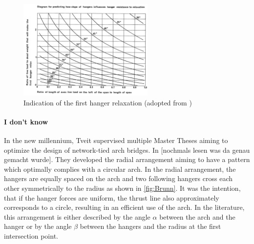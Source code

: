 \begin{figure}[H]
    \centering
    \includegraphics[width=0.6\textwidth]{Pictures/MaximumHangerInclination.png}
    \caption{Indication of the first hanger relaxation (adopted from \citep{Tveit3})}
    \label{fig:Tveit2}
\end{figure}


\paragraph*{I don't know}
In the new millennium, Tveit supervised multiple Master Theses aiming to optimize the design of network-tied arch bridges. In \citep{BrunnSchanack} [nochmals lesen was da genau gemacht wurde]. They developed the radial arrangement aiming to have a pattern which optimally complies with a circular arch. In the radial arrangement, the hangers are equally spaced on the arch and two following hangers cross each other symmetrically to the radius as shown in \autoref{fig:Brunn}. It was the intention, that if the hanger forces are uniform, the thrust line also approximately corresponds to a circle, resulting in an efficient use of the arch. In the literature, this arrangement is either described by the angle $\alpha$ between the arch and the hanger or by the angle $\beta$ between the hangers and the radius at the first intersection point.

